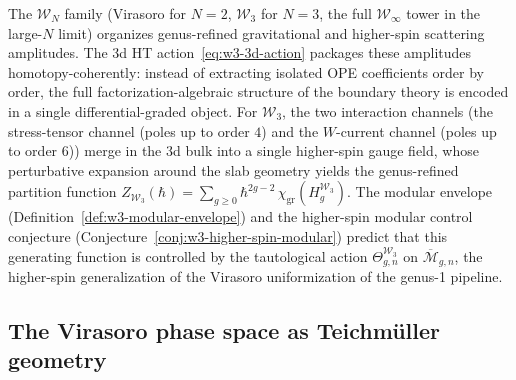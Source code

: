 \begin{remark}
\label{rem:w3-physical-interpretation}
The $\mathcal{W}_N$ family (Virasoro for $N=2$, $\mathcal{W}_3$ for
$N=3$, the full $\mathcal{W}_\infty$ tower in the large-$N$ limit)
organizes genus-refined gravitational and higher-spin scattering
amplitudes.  The 3d HT action~\eqref{eq:w3-3d-action} packages these
amplitudes homotopy-coherently: instead of extracting isolated OPE
coefficients order by order, the full factorization-algebraic structure
of the boundary theory is encoded in a single differential-graded
object.  For $\mathcal{W}_3$, the two interaction channels (the
stress-tensor channel (poles up to order $4$) and the $W$-current
channel (poles up to order $6$)) merge in the 3d bulk into a single
higher-spin gauge field, whose perturbative expansion around the slab
geometry yields the genus-refined partition function
$Z_{\mathcal{W}_3}(\hbar) = \sum_{g \geq 0}
\hbar^{2g-2}\,\chi_{\mathrm{gr}}(H_g^{\mathcal{W}_3})$.
The modular envelope (Definition~\ref{def:w3-modular-envelope}) and
the higher-spin modular control conjecture
(Conjecture~\ref{conj:w3-higher-spin-modular}) predict that this
generating function is controlled by the tautological action
$\Theta_{g,n}^{\mathcal{W}_3}$ on $\overline{\mathcal{M}}_{g,n}$,
the higher-spin generalization of the Virasoro uniformization of
the genus-1 pipeline.
\end{remark}


\subsection{The Virasoro phase space as Teichm\"uller geometry}
\label{subsec:virasoro-teichmuller-phase-space}

